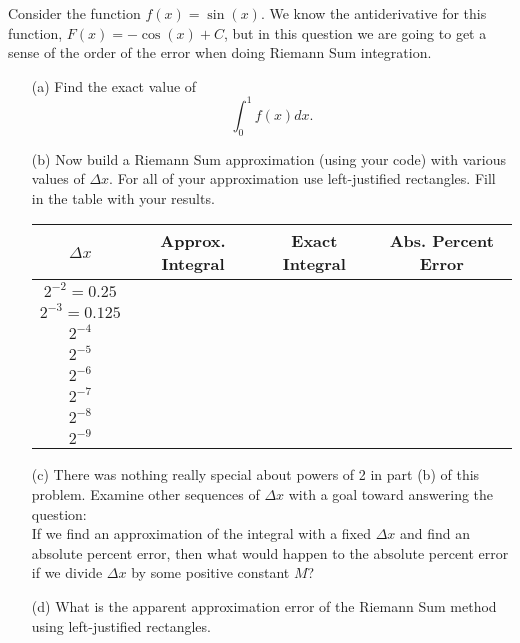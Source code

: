 \begin{problem}\label{prob:left_riemann_error}
    Consider the function $f(x) = \sin(x)$.  We know the antiderivative for this function,
    $F(x) = -\cos(x) + C$, but in this question we are going to get a sense of the order
    of the error when doing Riemann Sum integration. 
    \begin{enumerate}
        \item[(a)] Find the exact value of 
            \[ \int_0^{1} f(x) dx. \]
        \item[(b)] Now build a Riemann Sum approximation (using your code) with various
            values of $\Delta x$.  For all of your approximation use left-justified
            rectangles.  Fill in the table with your results. 
            \begin{center}
                \begin{tabular}{|c|c|c|c|}
                    \hline
                    $\Delta x$ & Approx. Integral & Exact Integral & Abs. Percent Error \\
                    \hline \hline
                    $2^{-2} = 0.25$ & & & \\ \hline
                    $2^{-3} = 0.125$ & & & \\ \hline
                    $2^{-4}$ & & & \\ \hline
                    $2^{-5}$ & & & \\ \hline
                    $2^{-6}$ & & & \\\hline
                    $2^{-7}$ & & & \\\hline
                    $2^{-8}$ & & & \\\hline
                    $2^{-9}$ & & & \\ \hline
                \end{tabular}
            \end{center}
        \item[(c)] There was nothing really special about powers of 2 in part (b) of this
            problem.  Examine other sequences of $\Delta x$ with a goal toward answering
            the question: \\
            If we find an approximation of the integral with a fixed $\Delta x$ and find
            an absolute percent error, then what would happen to the absolute percent
            error if we divide $\Delta x$ by some positive constant $M$?
        \item[(d)] What is the apparent approximation error of the Riemann Sum method
            using left-justified rectangles.
    \end{enumerate}
\end{problem}

